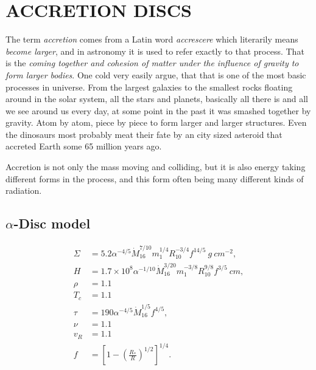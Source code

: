 \chapter{\color{red}ACCRETION DISCS}

The term \emph{accretion} comes from a Latin word \emph{accrescere} which literarily means \emph{become larger}, and in astronomy it is used to refer exactly to that process. That is the \emph{coming together and cohesion of matter under the influence of gravity to form larger bodies}. One cold very easily argue, that that is one of the most basic processes in universe. From the largest galaxies to the smallest rocks floating around in the solar system, all the stars and planets, basically all there is and all we see around us every day, at some point in the past it was smashed together by gravity. Atom by atom, piece by piece to form larger and larger structures. Even the dinosaurs most probably meat their fate by an city sized asteroid that accreted Earth some 65 million years ago. 

Accretion is not only the mass moving and colliding, but it is also energy taking different forms in the process, and this form often being many different kinds of radiation.

\section[$\alpha$-Disc model]{$\alpha$-Disc model}

\begin{align*}
\Sigma 	&= 5.2 \alpha^{-4/5} \dot{M}^{7/10}_{16} m^{1/4}_1 R^{-3/4}_{10} f^{14/5}\ g\ cm^{-2}, \\
H		&= 1.7 \times 10^8 \alpha^{-1/10} \dot{M}^{3/20}_{16} m^{-3/8}_1 R^{9/8}_{10} f^{3/5}\ cm, \\
\rho		&= 1.1 \\
T_c		&= 1.1 \\
\tau		&= 190 \alpha^{-4/5} \dot{M}^{1/5}_{16} f^{4/5}, \\
\nu		&= 1.1 \\
v_R		&= 1.1 \\
f		&= \left[ 1 - \left( \frac{R_*}{R} \right)^{1/2} \right]^{1/4}. \\
\end{align*}
